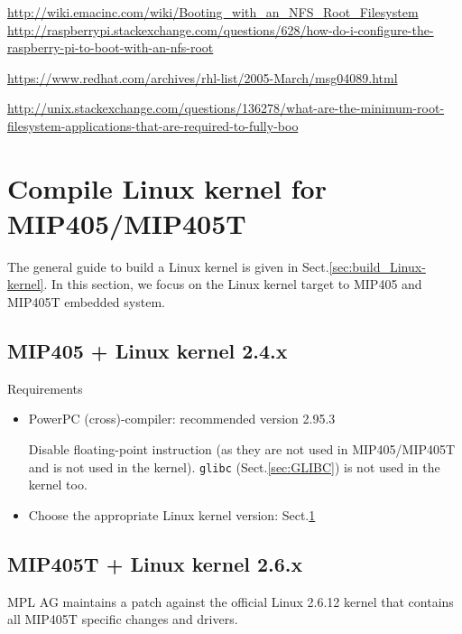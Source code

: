 \url{http://wiki.emacinc.com/wiki/Booting_with_an_NFS_Root_Filesystem}
\url{http://raspberrypi.stackexchange.com/questions/628/how-do-i-configure-the-raspberry-pi-to-boot-with-an-nfs-root}

\url{https://www.redhat.com/archives/rhl-list/2005-March/msg04089.html}

\url{http://unix.stackexchange.com/questions/136278/what-are-the-minimum-root-filesystem-applications-that-are-required-to-fully-boo}

\section{Compile Linux kernel for MIP405/MIP405T}
\label{sec:Linux_kernel_PowerPC}

The general guide to build a Linux kernel is given in
Sect.\ref{sec:build_Linux-kernel}.
In this section, we focus on the Linux kernel target to MIP405 and MIP405T
embedded system.

\subsection{MIP405 + Linux kernel 2.4.x}

Requirements
\begin{itemize}
  \item PowerPC (cross)-compiler: recommended version 2.95.3
  
  Disable floating-point instruction (as they are not used in MIP405/MIP405T and is not used in the kernel).
  \verb!glibc! (Sect.\ref{sec:GLIBC}) is not used in the kernel too.
  
  \item Choose the appropriate Linux kernel version:  Sect.\ref{sec:Linux_kernel_PowerPC}
  
\end{itemize}


\subsection{MIP405T + Linux kernel 2.6.x}
\label{sec:MIP405T_Linux2.6.x}

MPL AG maintains a patch against the official Linux 2.6.12 kernel that contains
all MIP405T specific changes and drivers.


